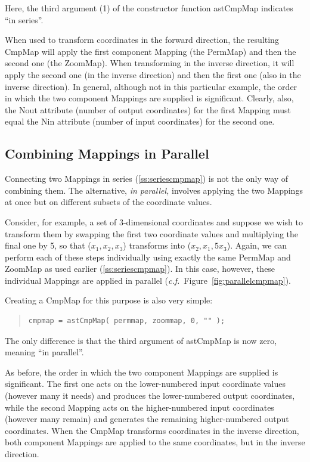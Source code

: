 \documentclass[twoside,11pt]{article}
\newcommand{\htmlref}[2]{#1}
\newcommand{\secref}[1]{\S\ref{#1}}
\renewcommand{\secref}[1]{\ref{#1}}
\begin{document}
Here, the third argument (1) of the constructor function \htmlref{astCmpMap}{astCmpMap}
indicates ``in series''.

When used to transform coordinates in the forward direction, the
resulting CmpMap will apply the first component \htmlref{Mapping}{Mapping} (the PermMap)
and then the second one (the ZoomMap). When transforming in the
inverse direction, it will apply the second one (in the inverse
direction) and then the first one (also in the inverse direction).  In
general, although not in this particular example, the order in which
the two component Mappings are supplied is significant. Clearly, also,
the \htmlref{Nout}{Nout} attribute (number of output coordinates) for the first
Mapping must equal the \htmlref{Nin}{Nin} attribute (number of input coordinates) for
the second one.

\subsection{Combining Mappings in Parallel}

Connecting two Mappings in series (\secref{ss:seriescmpmap}) is not the
only way of combining them. The alternative, {\em{in parallel,}}
involves applying the two Mappings at once but on different subsets of
the coordinate values.

Consider, for example, a set of 3-dimensional coordinates and suppose
we wish to transform them by swapping the first two coordinate values
and multiplying the final one by 5, so that ($x_1,x_2,x_3$) transforms
into ($x_2,x_1,5x_3$). Again, we can perform each of these steps
individually using exactly the same \htmlref{PermMap}{PermMap} and \htmlref{ZoomMap}{ZoomMap} as used
earlier (\secref{ss:seriescmpmap}). In this case, however, these
individual Mappings are applied in parallel
({\em{c.f.}}\ Figure~\ref{fig:parallelcmpmap}).

Creating a \htmlref{CmpMap}{CmpMap} for this purpose is also very simple:

\begin{quote}
\small
\begin{verbatim}
cmpmap = astCmpMap( permmap, zoommap, 0, "" );
\end{verbatim}
\normalsize
\end{quote}

The only difference is that the third argument of \htmlref{astCmpMap}{astCmpMap} is now
zero, meaning ``in parallel''.

As before, the order in which the two component Mappings are supplied
is significant. The first one acts on the lower-numbered input
coordinate values (however many it needs) and produces the
lower-numbered output coordinates, while the second \htmlref{Mapping}{Mapping} acts on
the higher-numbered input coordinates (however many remain) and
generates the remaining higher-numbered output coordinates.  When the
CmpMap transforms coordinates in the inverse direction, both component
Mappings are applied to the same coordinates, but in the inverse
direction.
\end{document}
